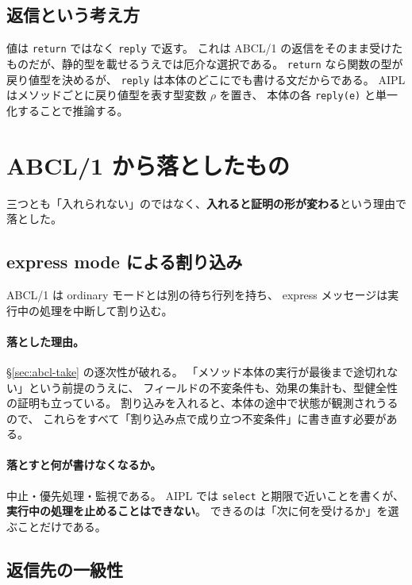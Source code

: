 \documentclass[11pt,a4paper]{ltjsarticle}
\theoremstyle{definition}
\theoremstyle{remark}
\begin{document}
\subsection{返信という考え方}

値は \texttt{return} ではなく \texttt{reply} で返す。
これは ABCL/1 の返信をそのまま受けたものだが、静的型を載せるうえでは厄介な選択である。
\texttt{return} なら関数の型が戻り値型を決めるが、
\texttt{reply} は本体のどこにでも書ける文だからである。
AIPL はメソッドごとに戻り値型を表す型変数 $\rho$ を置き、
本体の各 \texttt{reply(e)} と単一化することで推論する。

\section{ABCL/1 から落としたもの}
\label{sec:abcl-drop}

三つとも「入れられない」のではなく、\textbf{入れると証明の形が変わる}という理由で落とした。

\subsection{express mode による割り込み}

ABCL/1 は ordinary モードとは別の待ち行列を持ち、
express メッセージは実行中の処理を中断して割り込む。

\paragraph{落とした理由。}
\S\ref{sec:abcl-take} の逐次性が破れる。
「メソッド本体の実行が最後まで途切れない」という前提のうえに、
フィールドの不変条件も、効果の集計も、型健全性の証明も立っている。
割り込みを入れると、本体の途中で状態が観測されうるので、
これらをすべて「割り込み点で成り立つ不変条件」に書き直す必要がある。

\paragraph{落とすと何が書けなくなるか。}
中止・優先処理・監視である。
AIPL では \texttt{select} と期限で近いことを書くが、
\textbf{実行中の処理を止めることはできない}。
できるのは「次に何を受けるか」を選ぶことだけである。

\subsection{返信先の一級性}
\end{document}
